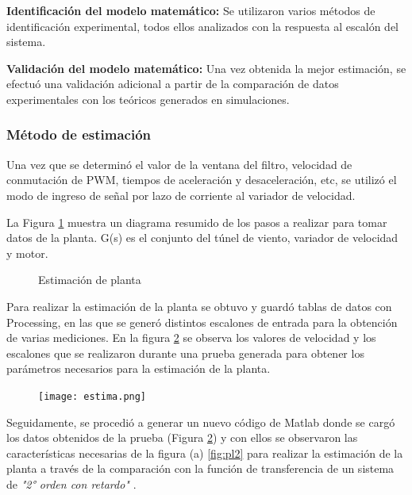  \textbf{Identificación del modelo matemático:} Se utilizaron varios métodos de identificación experimental, todos ellos analizados con la respuesta al escalón del sistema.

 \textbf{Validación del modelo matemático:} Una vez obtenida la mejor estimación, se efectuó una validación adicional a partir de la comparación de datos experimentales con los teóricos generados en simulaciones.






    \subsubsection{Método de estimación}

    Una vez que se determinó el valor de la ventana del filtro, velocidad de conmutación de PWM, tiempos de aceleración y desaceleración, etc, se utilizó el modo de ingreso de señal por lazo de corriente al variador de velocidad. 
    
    La Figura \ref{fig:bloques} muestra un diagrama resumido de los pasos a realizar para tomar datos de la planta. G(s) es el conjunto del túnel de viento, variador de velocidad y motor.


\begin{figure}[htbp]
	\centering
	\centering
	\caption{Estimación de planta} \label{fig:bloques}
\end{figure}
 
    
    Para realizar la estimación de la planta se obtuvo y guardó tablas de datos con Processing, en las que se generó distintos escalones de entrada para la obtención de varias mediciones. En la figura \ref{fig:est2} se observa los valores de velocidad y los escalones que se realizaron durante una prueba generada para obtener los parámetros necesarios para la estimación de la planta.
    
    \begin{figure}[htb]
    	\centering
    	\texttt{[image: estima.png]} %
    	\label{fig:est2}    
    \end{figure}
    
    Seguidamente, se procedió a generar un nuevo código de Matlab donde se cargó los datos obtenidos de la prueba (Figura \ref{fig:est2}) y con ellos se observaron las características necesarias de la figura (a) \ref{fig:pl2} para realizar la estimación de la planta a través de la comparación con la función de transferencia de un sistema de \textit{"2° orden con retardo"} \cite{pomares2011sistemas}.
    

